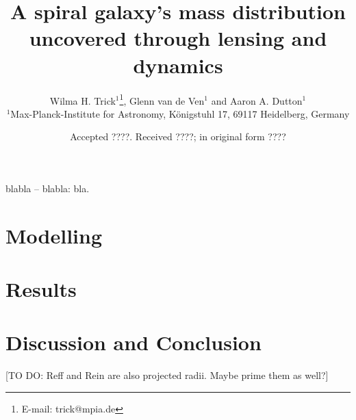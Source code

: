 \documentclass[useAMS,usenatbib]{mn2e}
\title[A spiral galaxy's mass distribution uncovered]{A spiral galaxy's mass distribution uncovered through lensing and dynamics}
\author[W. H. Trick, G. van de Ven and A. A. Dutton]{Wilma H. Trick$^{1}$\thanks{E-mail:
trick@mpia.de}, Glenn van de Ven$^{1}$ and Aaron A. Dutton$^{1}$\\
$^{1}$Max-Planck-Institute for Astronomy, K\"{o}nigstuhl 17, 69117 Heidelberg, Germany}
\begin{document}
\date{Accepted ????. Received ????; in original form ????}

\pagerange{\pageref{firstpage}--\pageref{lastpage}} 

\maketitle

\label{firstpage}

\begin{abstract}

\end{abstract}

\begin{keywords}
blabla -- blabla: bla.
\end{keywords}



\section{Modelling} \label{sec:Modelling}






\section{Results} \label{sec:Results}





\section{Discussion and Conclusion} \label{sec:Discussion}




[TO DO: Reff and Rein are also projected radii. Maybe prime them as well?]




\label{lastpage}
\end{document}
